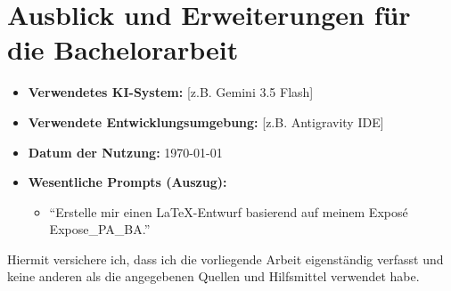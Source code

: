 \documentclass[12pt,twoside=false,a4paper,parskip]{scrbook}
\begin{document}
\section{Ausblick und Erweiterungen für die Bachelorarbeit}


\backmatter

\listoffigures
{}



\appendix
{}

 \label{appendix:skripte}

 \label{appendix:ki_deklaration}
\begin{itemize}
  \item \textbf{Verwendetes KI-System:} [z.B. Gemini 3.5 Flash]
  \item \textbf{Verwendete Entwicklungsumgebung:} [z.B. Antigravity IDE]
  \item \textbf{Datum der Nutzung:} \today
  \item \textbf{Wesentliche Prompts (Auszug):}
        \begin{itemize}
          \item \enquote{Erstelle mir einen LaTeX-Entwurf basierend auf meinem Exposé Expose\_PA\_BA.}
        \end{itemize}
\end{itemize}

\listoftables


\cleardoublepage
{}
{}




Hiermit versichere ich, dass ich die vorliegende Arbeit eigenständig verfasst und keine anderen als die angegebenen Quellen und Hilfsmittel verwendet habe.
\end{document}
